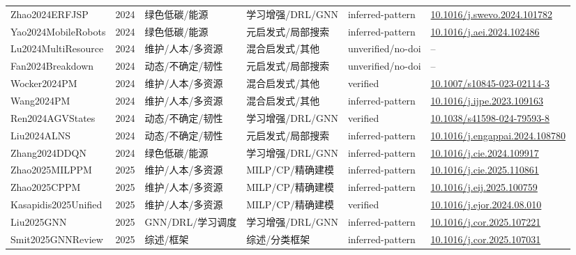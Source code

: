 \documentclass[UTF8,a4paper,11pt]{ctexart}
\begin{document}
\begin{landscape}
\begin{longtable}{>{\raggedright\arraybackslash}p{5.0cm}p{0.8cm}>{\raggedright\arraybackslash}p{2.6cm}>{\raggedright\arraybackslash}p{2.8cm}>{\raggedright\arraybackslash}p{2.6cm}>{\raggedright\arraybackslash}p{5.4cm}}
Zhao2024ERFJSP & 2024 & 绿色低碳/能源 & 学习增强/DRL/GNN & inferred-pattern & \href{https://doi.org/10.1016/j.swevo.2024.101782}{10.1016/j.swevo.2024.101782} \\
Yao2024MobileRobots & 2024 & 绿色低碳/能源 & 元启发式/局部搜索 & inferred-pattern & \href{https://doi.org/10.1016/j.aei.2024.102486}{10.1016/j.aei.2024.102486} \\
Lu2024MultiResource & 2024 & 维护/人本/多资源 & 混合启发式/其他 & unverified/no-doi & -- \\
Fan2024Breakdown & 2024 & 动态/不确定/韧性 & 元启发式/局部搜索 & unverified/no-doi & -- \\
Wocker2024PM & 2024 & 维护/人本/多资源 & 混合启发式/其他 & verified & \href{https://doi.org/10.1007/s10845-023-02114-3}{10.1007/s10845-023-02114-3} \\
Wang2024PM & 2024 & 维护/人本/多资源 & 混合启发式/其他 & inferred-pattern & \href{https://doi.org/10.1016/j.ijpe.2023.109163}{10.1016/j.ijpe.2023.109163} \\
Ren2024AGVStates & 2024 & 动态/不确定/韧性 & 学习增强/DRL/GNN & verified & \href{https://doi.org/10.1038/s41598-024-79593-8}{10.1038/s41598-024-79593-8} \\
Liu2024ALNS & 2024 & 动态/不确定/韧性 & 元启发式/局部搜索 & inferred-pattern & \href{https://doi.org/10.1016/j.engappai.2024.108780}{10.1016/j.engappai.2024.108780} \\
Zhang2024DDQN & 2024 & 绿色低碳/能源 & 学习增强/DRL/GNN & inferred-pattern & \href{https://doi.org/10.1016/j.cie.2024.109917}{10.1016/j.cie.2024.109917} \\
Zhao2025MILPPM & 2025 & 维护/人本/多资源 & MILP/CP/精确建模 & inferred-pattern & \href{https://doi.org/10.1016/j.cie.2025.110861}{10.1016/j.cie.2025.110861} \\
Zhao2025CPPM & 2025 & 维护/人本/多资源 & MILP/CP/精确建模 & inferred-pattern & \href{https://doi.org/10.1016/j.eij.2025.100759}{10.1016/j.eij.2025.100759} \\
Kasapidis2025Unified & 2025 & 维护/人本/多资源 & MILP/CP/精确建模 & verified & \href{https://doi.org/10.1016/j.ejor.2024.08.010}{10.1016/j.ejor.2024.08.010} \\
Liu2025GNN & 2025 & GNN/DRL/学习调度 & 学习增强/DRL/GNN & inferred-pattern & \href{https://doi.org/10.1016/j.cor.2025.107221}{10.1016/j.cor.2025.107221} \\
Smit2025GNNReview & 2025 & 综述/框架 & 综述/分类框架 & inferred-pattern & \href{https://doi.org/10.1016/j.cor.2025.107031}{10.1016/j.cor.2025.107031} \\

\end{longtable}
\end{landscape}
\end{document}
